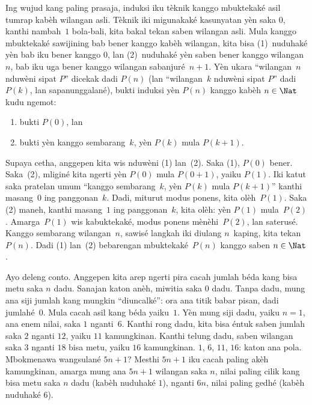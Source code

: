\documentclass[../../../include/open-logic-section]{subfiles}
\begin{document}


Ing wujud kang paling prasaja, induksi iku tèknik
kanggo mbuktekaké asil tumrap kabèh wilangan asli.
Tèknik iki migunakaké kasunyatan yèn saka $0$,
kanthi nambah~$1$ bola-bali, kita bakal tekan
saben wilangan asli. Mula kanggo mbuktekaké
sawijining bab bener kanggo kabèh wilangan,
kita bisa (1)~nuduhaké yèn bab iku bener kanggo $0$,
lan (2)~nuduhaké yèn saben bener kanggo
wilangan~$n$, bab iku uga bener kanggo wilangan
sabanjuré~$n+1$. Yèn ukara ``wilangan~$n$
nduwèni sipat $P$'' dicekak dadi $P(n)$
(lan ``wilangan~$k$ nduwèni sipat $P$''
dadi $P(k)$, lan sapanunggalané), bukti
induksi yèn $P(n)$ kanggo kabèh $n \in \Nat$
kudu ngemot:
\begin{enumerate}
\item bukti $P(0)$, lan
\item bukti yèn kanggo sembarang~$k$,
  yèn $P(k)$ mula $P(k+1)$.
\end{enumerate}
Supaya cetha, anggepen kita wis nduwèni
(1) lan~(2). Saka (1), $P(0)$ bener.
Saka~(2), mliginé kita ngerti yèn
$P(0)$ mula $P(0+1)$, yaiku $P(1)$.
Iki katut saka pratelan umum ``kanggo
sembarang~$k$, yèn $P(k)$ mula
$P(k+1)$'' kanthi masang~$0$ ing panggonan~$k$.
Dadi, miturut modus ponens, kita olèh~$P(1)$.
Saka (2) maneh, kanthi masang~$1$ ing panggonan~$k$,
kita olèh: yèn $P(1)$ mula~$P(2)$.
Amarga~$P(1)$ wis kabuktekaké, modus
ponens mènèhi~$P(2)$, lan saterusé.
Kanggo sembarang wilangan~$n$, sawisé
langkah iki diulang $n$~kaping, kita tekan~$P(n)$.
Dadi (1) lan~(2) bebarengan mbuktekaké~$P(n)$
kanggo saben $n
\in \Nat$.

Ayo deleng conto. Anggepen kita arep ngerti
pira cacah jumlah béda kang bisa metu saka
$n$ dadu. Sanajan katon anèh, miwitia
saka $0$ dadu. Tanpa dadu, mung ana siji
jumlah kang mungkin ``diuncalké'': ora ana
titik babar pisan, dadi jumlahé~$0$.
Mula cacah asil kang béda yaiku~$1$.
Yèn mung siji dadu, yaiku $n=1$,
ana enem nilai, saka $1$ nganti~$6$.
Kanthi rong dadu, kita bisa éntuk
saben jumlah saka $2$ nganti $12$,
yaiku $11$ kamungkinan. Kanthi telung
dadu, saben wilangan saka $3$ nganti
$18$ bisa metu, yaiku $16$ kamungkinan.
$1$, $6$, $11$, $16$: katon ana pola.
Mbokmenawa wangsulané $5n+1$?
Mesthi $5n+1$ iku cacah paling akèh
kamungkinan, amarga mung ana $5n+1$
wilangan saka $n$, nilai paling cilik
kang bisa metu saka $n$ dadu
(kabèh nuduhaké $1$), nganti $6n$,
nilai paling gedhé (kabèh nuduhaké $6$).
\end{document}
